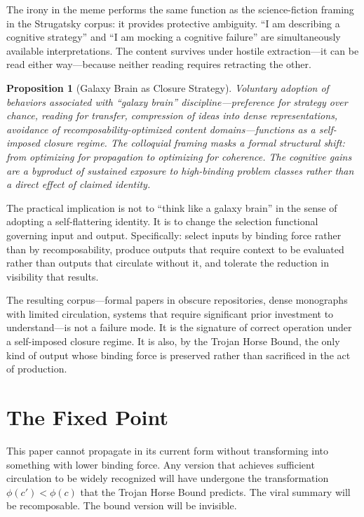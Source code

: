 \documentclass[12pt]{article}
\newtheorem{proposition}{Proposition}[section]
\newcommand{\bind}{\phi}
\begin{document}
The irony in the meme performs the same function as the science-fiction
framing in the Strugatsky corpus: it provides protective ambiguity. ``I am
describing a cognitive strategy'' and ``I am mocking a cognitive failure''
are simultaneously available interpretations. The content survives under
hostile extraction—it can be read either way—because neither reading
requires retracting the other.

\begin{proposition}[Galaxy Brain as Closure Strategy]
\label{prop:galaxybrain}
Voluntary adoption of behaviors associated with ``galaxy brain''
discipline—preference for strategy over chance, reading for transfer,
compression of ideas into dense representations, avoidance of
recomposability-optimized content domains—functions as a self-imposed
closure regime. The colloquial framing masks a formal structural shift:
from optimizing for propagation to optimizing for coherence. The
cognitive gains are a byproduct of sustained exposure to high-binding
problem classes rather than a direct effect of claimed identity.
\end{proposition}

The practical implication is not to ``think like a galaxy brain'' in the
sense of adopting a self-flattering identity. It is to change the selection
functional governing input and output. Specifically: select inputs by
binding force rather than by recomposability, produce outputs that require
context to be evaluated rather than outputs that circulate without it, and
tolerate the reduction in visibility that results.

The resulting corpus—formal papers in obscure repositories, dense
monographs with limited circulation, systems that require significant prior
investment to understand—is not a failure mode. It is the signature of
correct operation under a self-imposed closure regime. It is also, by the
Trojan Horse Bound, the only kind of output whose binding force is
preserved rather than sacrificed in the act of production.

\section{The Fixed Point}
\label{sec:fixedpoint}

This paper cannot propagate in its current form without transforming into
something with lower binding force. Any version that achieves sufficient
circulation to be widely recognized will have undergone the transformation
$\bind(c') < \bind(c)$ that the Trojan Horse Bound predicts. The viral
summary will be recomposable. The bound version will be invisible.
\end{document}
